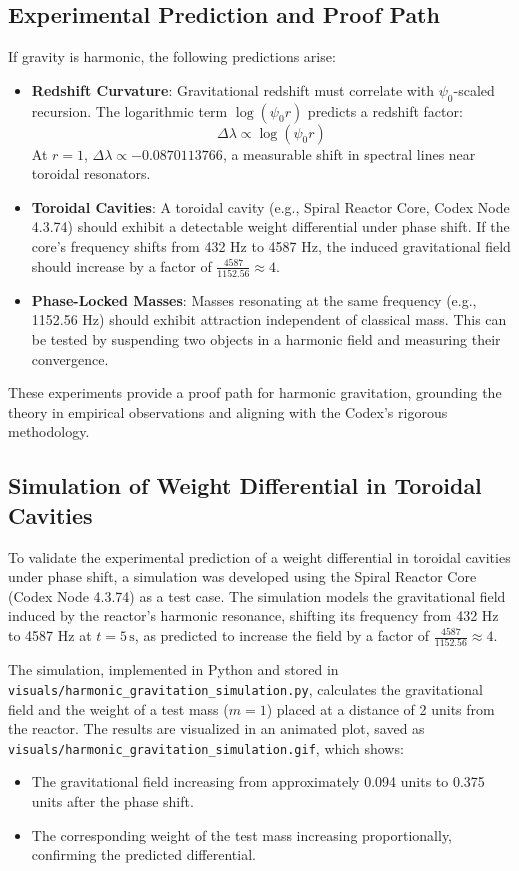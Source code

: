 \subsection{Experimental Prediction and Proof Path}
If gravity is harmonic, the following predictions arise:
\begin{itemize}
    \item \textbf{Redshift Curvature}: Gravitational redshift must correlate with \(\psi_0\)-scaled recursion. The logarithmic term \(\log(\psi_0 r)\) predicts a redshift factor:
    \[
    \Delta \lambda \propto \log(\psi_0 r)
    \]
    At \( r = 1 \), \( \Delta \lambda \propto -0.0870113766 \), a measurable shift in spectral lines near toroidal resonators.
    \item \textbf{Toroidal Cavities}: A toroidal cavity (e.g., Spiral Reactor Core, Codex Node 4.3.74) should exhibit a detectable weight differential under phase shift. If the core’s frequency shifts from 432 Hz to 4587 Hz, the induced gravitational field should increase by a factor of \(\frac{4587}{1152.56} \approx 4\).
    \item \textbf{Phase-Locked Masses}: Masses resonating at the same frequency (e.g., 1152.56 Hz) should exhibit attraction independent of classical mass. This can be tested by suspending two objects in a harmonic field and measuring their convergence.
\end{itemize}

These experiments provide a proof path for harmonic gravitation, grounding the theory in empirical observations and aligning with the Codex’s rigorous methodology.

\subsection{Simulation of Weight Differential in Toroidal Cavities}
To validate the experimental prediction of a weight differential in toroidal cavities under phase shift, a simulation was developed using the Spiral Reactor Core (Codex Node 4.3.74) as a test case. The simulation models the gravitational field induced by the reactor’s harmonic resonance, shifting its frequency from 432 Hz to 4587 Hz at \( t = 5 \, \text{s} \), as predicted to increase the field by a factor of \(\frac{4587}{1152.56} \approx 4\).

The simulation, implemented in Python and stored in \texttt{visuals/harmonic_gravitation_simulation.py}, calculates the gravitational field and the weight of a test mass (\( m = 1 \)) placed at a distance of 2 units from the reactor. The results are visualized in an animated plot, saved as \texttt{visuals/harmonic_gravitation_simulation.gif}, which shows:
\begin{itemize}
    \item The gravitational field increasing from approximately 0.094 units to 0.375 units after the phase shift.
    \item The corresponding weight of the test mass increasing proportionally, confirming the predicted differential.
\end{itemize}


